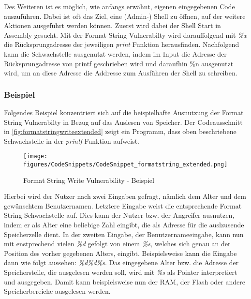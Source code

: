 \documentclass[a4paper,
DIV=13,
12pt,
BCOR=10mm,
department=FakIM,
oneside,
parskip=half,
automark,
listof=totocnumbered,
bibliography=totocnumbered,
acronym=totocnumbered
] {OTHRartcl}
\begin{document}
Des Weiteren ist es möglich, wie anfangs erwähnt, eigenen eingegebenen Code auszuführen. Dabei ist oft das Ziel,
eine (Admin-) Shell zu öffnen, auf der weitere Aktionen ausgeführt werden können.
Zuerst wird dabei der Shell Start in Assembly gesucht. Mit der Format String Vulnerabilty wird darauffolgend mit \textit{\%x} die Rücksprungadresse
der jeweiligen \textit{print} Funktion herausfinden. Nachfolgend kann die Schwachstelle ausgenutzt werden, indem im Input die Adresse der Rücksprungadresse von printf geschrieben wird
und daraufhin \%n ausgenutzt wird, um an diese Adresse die Addresse zum Ausführen der Shell zu schreiben. \cite{Format String Exploits}

\subsubsection{Beispiel}
Folgendes Beispiel konzentriert sich auf die beispielhafte Ausnutzung der Format String Vulnerabilty in Bezug auf das Auslesen von Speicher.
Der Codeausschnitt in \autoref{fig:formatstringwriteextended} zeigt ein Programm, dass oben beschriebene Schwachstelle in der \textit{printf} Funktion aufweist.
\begin{figure}[ht!]
  \begin{center}
    \texttt{[image: figures/CodeSnippets/CodeSnippet\_formatstring\_extended.png]}
    \caption{Format String Write Vulnerability - Beispiel}
    \label{fig:formatstringwriteextended}
  \end{center}
\end{figure}
Hierbei wird der Nutzer nach zwei Eingaben gefragt, nämlich dem Alter und dem gewünschtem Benutzernamen.
Letztere Eingabe weist die entsprechende Format String Schwachstelle auf.
Dies kann der Nutzer bzw. der Angreifer ausnutzen, indem er als Alter eine beliebige Zahl eingibt, die als Adresse für die auslzusende Speicherzelle dient.
In der zweiten Eingabe, der Benutzernameeingabe, kann nun mit enstprechend vielen \textit{\%d} gefolgt von einem \textit{\%s}, welches sich genau an der Position des
vorher gegebenen Alters, eingibt. Beispielsweise kann die Eingabe dann wie folgt aussehen: \textit{\%d\%d\%s}.
Das eingegebene Alter bzw. die Adresse der Speicherstelle, die ausgelesen werden soll, wird mit \textit{\%s} als Pointer interpretiert und ausgegeben.
Damit kann beispielsweise nun der RAM, der Flash oder andere Speicherbereiche ausgelesen werden.
\end{document}
